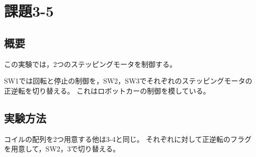 \documentclass[a4paper,10pt]{jsarticle}
\begin{document}
\section{課題3-5}
\subsection{概要}
この実験では，2つのステッピングモータを制御する。

SW1では回転と停止の制御を，SW2，SW3でそれぞれのステッピングモータの正逆転を切り替える。
これはロボットカーの制御を模している。

\subsection{実験方法}
コイルの配列を2つ用意する他は3-4と同じ。
それぞれに対して正逆転のフラグを用意して，SW2，3で切り替える。
\end{document}
